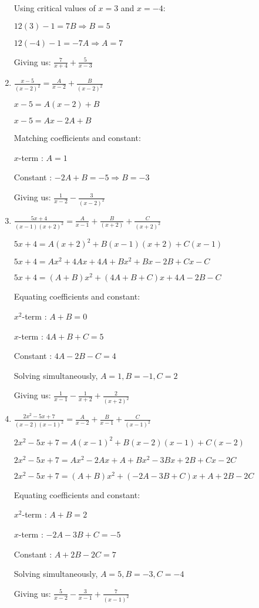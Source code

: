 \documentclass[../main.tex]{subfiles}
\begin{document}
\begin{enumerate}[itemsep=0.7cm]
    Using critical values of $x=3$ and $x=-4$:

    $12(3)-1=7B \Rightarrow B=5$

    $12(-4)-1=-7A \Rightarrow A=7$

    Giving us: $\frac{7}{x+4}+\frac{5}{x-3}$

    \item 
    $\frac{x-5}{(x-2)^2}=\frac{A}{x-2}+\frac{B}{(x-2)^2}$

    $x-5=A(x-2)+B$

    $x-5=Ax-2A+B$

    Matching coefficients and constant:

    $x$-term : $A=1$

    Constant : $-2A+B=-5 \Rightarrow B=-3$

    Giving us: $\frac{1}{x-2}-\frac{3}{(x-2)^2}$

    \item 
    $\frac{5x+4}{(x-1)(x+2)^2}=\frac{A}{x-1}+\frac{B}{(x+2)}+\frac{C}{(x+2)^2}$

    $5x+4=A(x+2)^2+B(x-1)(x+2)+C(x-1)$

    $5x+4=Ax^2+4Ax+4A+Bx^2+Bx-2B+Cx-C$

    $5x+4=(A+B)x^2+(4A+B+C)x+4A-2B-C$

    Equating coefficients and constant:

    $x^2$-term : $A+B=0$

    $x$-term : $4A+B+C=5$

    Constant : $4A-2B-C=4$

    Solving simultaneously, $A=1,B=-1, C=2$

    Giving us: $\frac{1}{x-1}-\frac{1}{x+2}+\frac{2}{(x+2)^2}$

    \item 
    $\frac{2x^2-5x+7}{(x-2)(x-1)^2}=\frac{A}{x-2}+\frac{B}{x-1}+\frac{C}{(x-1)^2}$

    $2x^2-5x+7=A(x-1)^2+B(x-2)(x-1)+C(x-2)$

    $2x^2-5x+7=Ax^2-2Ax+A+Bx^2-3Bx+2B+Cx-2C$

    $2x^2-5x+7=(A+B)x^2+(-2A-3B+C)x+A+2B-2C$

    Equating coefficients and constant:

    $x^2$-term : $A+B=2$

    $x$-term : $-2A-3B+C=-5$

    Constant : $A+2B-2C=7$

    Solving simultaneously, $A=5, B=-3, C=-4$

    Giving us: $\frac{5}{x-2}-\frac{3}{x-1}+\frac{7}{(x-1)^2}$


\end{enumerate}
\end{document}
